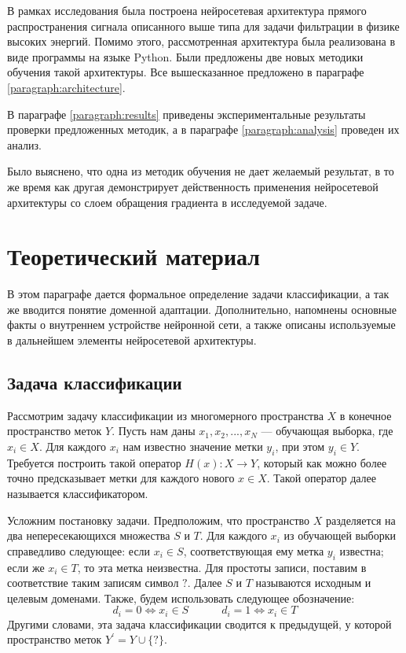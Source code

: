 \documentclass[14pt, a4paper]{extarticle}
\begin{document}
В рамках исследования была построена нейросетевая архитектура прямого распространения сигнала описанного выше типа для задачи фильтрации в физике высоких энергий. Помимо этого, рассмотренная архитектура была реализована в виде программы на языке Python. Были предложены две новых методики обучения такой архитектуры. Все вышесказанное предложено в параграфе \ref{paragraph:architecture}.

В параграфе \ref{paragraph:results} приведены экспериментальные результаты проверки предложенных методик, а в параграфе \ref{paragraph:analysis} проведен их анализ.

Было выяснено, что одна из методик обучения не дает желаемый результат, в то же время как другая демонстрирует действенность применения нейросетевой архитектуры со слоем обращения градиента в исследуемой задаче.

\newpage 

\section{Теоретический материал}
\label{paragraph:theory}

В этом параграфе дается формальное определение задачи классификации, а так же вводится понятие доменной адаптации. Дополнительно, напомнены основные факты о внутреннем устройстве нейронной сети, а также описаны используемые в дальнейшем элементы нейросетевой архитектуры.

\subsection*{Задача классификации}
\label{class_task}

Рассмотрим задачу классификации из многомерного пространства $X$ в конечное пространство меток $Y$. Пусть нам даны ${x_1, x_2, ..., x_N}$ — обучающая выборка, где $x_i \in X$. Для каждого $x_i$ нам известно значение метки $y_i$, при этом $y_i \in Y$. Требуется построить такой оператор $H(x): X \rightarrow Y$, который как можно более точно предсказывает метки для каждого нового $x \in X$. Такой оператор далее называется классификатором.

Усложним постановку задачи. Предположим, что пространство $X$ разделяется на два непересекающихся множества $S$ и $T$. Для каждого $x_i$ из обучающей выборки справедливо следующее: если $x_i \in S$, соответствующая ему метка $y_i$ известна; если же $x_i \in T$, то эта метка неизвестна. Для простоты записи, поставим в соответствие таким записям символ $\mathbb{?}$. Далее $S$ и $T$ называются исходным и целевым доменами. Также, будем использовать следующее обозначение:
\begin{equation*}
	d_i = 0 \Leftrightarrow x_i \in S \quad \quad \quad
	d_i = 1 \Leftrightarrow x_i \in T 
\end{equation*}
Другими словами, эта задача классификации сводится к предыдущей, у которой пространство меток $Y^{'} = Y \cup \{?\}$.
\end{document}
